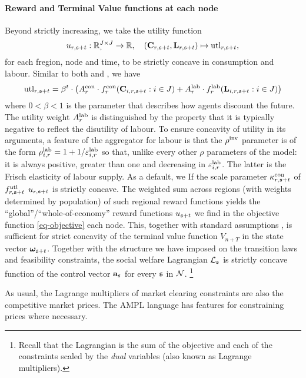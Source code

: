 \documentclass[12pt,a4paper,twoside, draft]{article}
\begin{document}
\paragraph{Reward and Terminal Value functions at each node}
Beyond strictly increasing, we take the utility function
\[
u_{r, \node + t}: \nnreal^{J \times J} \rightarrow \R, \quad
  (\mathbf{C}_{r, \node + t}, \mathbf{L}_{r, \node + t})
    \mapsto \textup{utl}_{r, \node + t},
\]
for each fregion, node and time,
to be strictly concave in consumption and labour.
Similar to both \citet{Atalay-Sectoral_shocks} and \citet{CJ}, we have
\begin{equation}
  \textup{utl}_{r, \mathfrak{s} + t}
    = \beta^{t}
      \cdot \left(
        A_{r}^\textup{con}
          \cdot f_{r}^{\textup{con}}(\mathbf{C}_{i, r, \mathfrak{s} + t}: i \in J)
        + A_{r}^{\textup{lab}}
          \cdot f_{r}^{{\textup{lab}}}(\mathbf{L}_{i, r, \mathfrak{s} + t}: i \in J)
      \right)
\end{equation}
where $0 < \beta < 1$ is the parameter that describes how agents discount
the future.
The utility weight $A_{r}^{{\textup{lab}}}$ is distinguished by the property that
it is typically negative to reflect the disutility of labour.
To ensure concavity of utility in its arguments, a
feature of the aggregator for labour is that the $\rho^{\textup{inv}}$ parameter
is of the form
$\rho_{i, r}^{{\textup{lab}}} = 1 + 1 / \varepsilon_{i, r}^{{\textup{lab}}}$
so that, unlike every other $\rho$ parameters of the model: it is always
positive, greater than one and decreasing in $\varepsilon_{i, r}^{\textup{lab}}$.
The latter is the Frisch elasticity of labour supply.
As a default, we If the scale parameter $\kappa_{r, \mathfrak{s} + t}^\textup{con}$ of 
$f_{r, \mathfrak{s} + t}^\textup{utl}$ ${u}_{r, \mathfrak{s} + t}$ is strictly concave.
The weighted sum across regions (with weights determined by population) of such
regional reward functions yields the ``global''/``whole-of-economy'' reward
functions ${u}_{\mathfrak{s} + t}$ we find in the objective function
\eqref{eq-objective} each node.
This, together with standard assumptions
\citep[Theorem 12.2.12]{Stachurski-Economic_dynamics}, is sufficient for strict
concavity of the terminal value function ${V}_{n + T}$ in the state
vector $\boldsymbol{\omega}_{\mathfrak{s} + t}$.
Together with the structure we have imposed on the transition laws and
feasibility constraints, the social welfare Lagrangian $\mathcal L_{\mathfrak{s}}$ is
strictly concave function of the control vector $\mathbf{a}_{\mathfrak{s}}$ for every $\mathfrak{s}$ in
$\mathcal N$.
\footnote{
Recall that the Lagrangian is the sum of the objective and each of the
constraints scaled by the \emph{dual} variables (also known as Lagrange
multipliers).
}
\begin{remark*}
As usual, the Lagrange multipliers of market clearing constraints are also the
competitive market prices.
The AMPL language has features for constraining prices where necessary.
\end{remark*}
\end{document}
